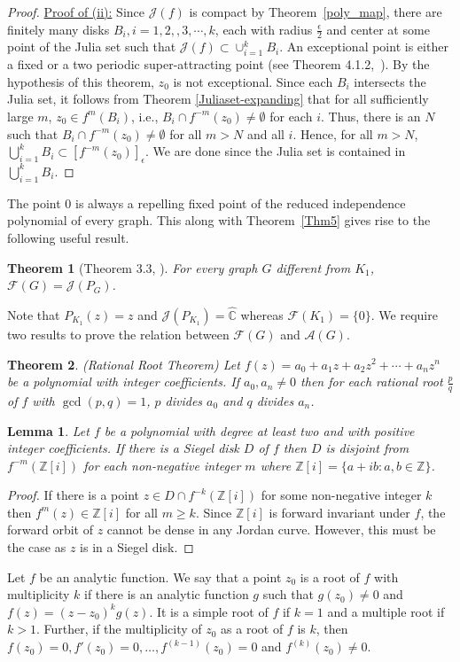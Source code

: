\documentclass[12pt,a4paper]{article}
\theoremstyle{plain}
\newtheorem{theorem}{Theorem}[section]
\newtheorem{lemma}{Lemma}
\numberwithin{equation}{section}
\begin{document}
\begin{proof}
\underline{Proof of (ii):}  Since \(\mathcal{J}(f)\) is compact by Theorem~\ref{poly_map}, there are finitely many disks $B_i, i=1,2,,3,\cdots, k$, each with radius $\frac{\epsilon}{2}$ and center at some point of the Julia set such that $\mathcal{J}(f) \subset \cup_{i=1}^{k} B_i $. An exceptional point is either a  fixed  or a  two periodic super-attracting point (see Theorem 4.1.2,~\cite{beardon}). By the hypothesis of this theorem,  \(z_0\) is not  exceptional. Since each $B_i$ intersects the Julia set, it follows from Theorem \ref{Juliaset-expanding} that for all sufficiently large \(m\), $ z_0 \in  f^{m}(B_i) $, i.e., $B_i \cap f^{-m}(z_0)  \neq \emptyset$ for each $i$. Thus, there is an $N$ such that $B_i \cap f^{-m}(z_0)  \neq \emptyset$ for all $m>N$ and all $i$.
      Hence, for all   \(m > N\),
       $\bigcup_{i=1}^{k} B_i \subset [f^{-m}(z_0)]_{\epsilon}$. We are done since the Julia set is contained in  $\bigcup_{i=1}^{k} B_i$.
    \end{proof}
The point $0$ is always a repelling fixed point of the reduced independence polynomial of every graph. This along with Theorem~\ref{Thm5}  gives rise to the following useful result. 

\begin{theorem} [Theorem 3.3, \cite{brownetal2003}]
	For every graph $G$ different from $K_1$,  $\mathcal{F}(G) =\mathcal{J}(P_G)$.
	\label{indfractal=Juliaset}
\end{theorem} Note that $P_{K_1}(z)=z$ and $\mathcal{J}(P_{K_1})=\widehat{\mathbb{C}}$ whereas $\mathcal{F}(K_1) =\{0\}$.
We require two results to prove the relation between $\mathcal{F}(G)$ and $\mathcal{A}(G)$.
 \begin{theorem}(Rational Root Theorem)
        Let $f(z)=a_0 + a_1z +a_2z^2 + \cdots + a_nz^n$ be a polynomial with integer coefficients. If $a_0, a_n \neq 0$ then for each rational root $\frac{p}{q}$ of $f$ with $\gcd(p,q)=1$,  $p$ divides $a_0$ and $q$ divides $a_n$.
\end{theorem}

\begin{lemma}
     Let $f$ be a polynomial with degree at least two and with positive integer coefficients. If there is a Siegel disk $D$ of $f$ then $D$ is disjoint from $f^{-m}(\mathbb{Z}[i])$ for each non-negative integer  $m$ where $\mathbb{Z}[i] =\{a+ib: a,b \in \mathbb{Z}\}$.
    \label{Siegel}
\end{lemma}
\begin{proof}
If there is a point $z \in D \cap f^{-k}( \mathbb{Z}[i])$ for some non-negative integer $k$ then $f^m (z) \in \mathbb{Z}[i]$ for all $ m \geq k$. Since 	$\mathbb{Z}[i]$ is forward invariant under $f$, the forward orbit of $z$ cannot be dense in any Jordan curve. However, this must be the case as $z$ is in a Siegel disk.
\end{proof}
Let $f$ be an analytic function. We say that a point $z_0$ is a root of $f$ with multiplicity $k$ if there is an analytic function $g$ such that 
$g(z_0) \neq 0$ and $f(z) = (z-z_0)^k g(z)$. It is a simple root of $f$ if $k=1$ and a multiple root if $k>1$. Further, if the multiplicity of $z_0$ as a root of $f$ is $k$, then $f(z_0)=0, f'(z_0)=0, \ldots, f^{(k-1)}(z_0)=0$ and $f^{(k)}(z_0)\neq 0$.
\end{document}
